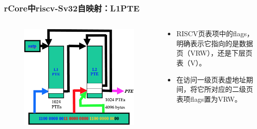 \begin{frame}
    \frametitle{rCore中riscv-Sv32自映射：L1PTE}

    \begin{columns}
    \begin{column}{0.6\textwidth}
        \begin{figure}
        \includegraphics[width=0.85\linewidth]{lecture07/figs/RV-L1-self-mapping.png}
        \end{figure}
    \end{column} \pause
    \begin{column}{0.4\textwidth}
        \begin{itemize}
            \item RISCV页表项中的flags，明确表示它指向的是数据页（VRW），还是下层页表（V）。
            \item 在访问一级页表虚地址期间，将它所对应的二级页表项flags置为VRW。
        \end{itemize}
    \end{column}
    \end{columns}

\end{frame}
% 
% 
% 
